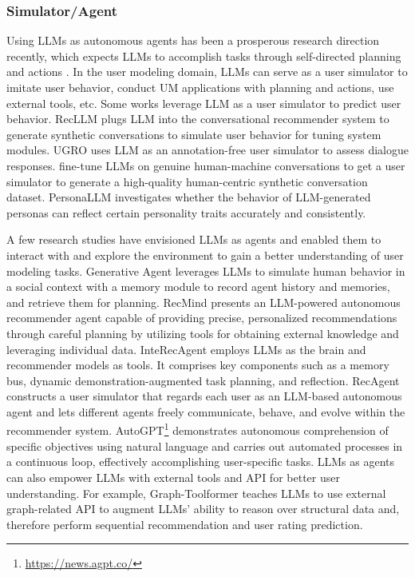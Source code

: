 \documentclass[11pt]{article}
\begin{document}
\subsubsection{Simulator/Agent}
Using LLMs as autonomous agents has been a prosperous research direction recently, which expects LLMs to accomplish tasks through self-directed planning and actions \cite{wang2023survey}. In the user modeling domain, LLMs can serve as a user simulator to imitate user behavior, conduct UM applications with planning and actions, use external tools, etc. Some works leverage LLM as a user simulator to predict user behavior. RecLLM \cite{friedman2023leveraging} plugs LLM into the conversational recommender system to generate synthetic conversations to simulate user behavior for tuning system modules. UGRO \cite{hu2023unlocking} uses LLM as an annotation-free user simulator to assess dialogue responses.
\citet{kong2023large} fine-tune LLMs on genuine human-machine conversations to get a user simulator to generate a high-quality human-centric synthetic conversation dataset. PersonaLLM \cite{jiang2023personallm} investigates whether the behavior of LLM-generated personas can reflect certain personality traits accurately and consistently. 


A few research studies have envisioned LLMs as agents and enabled them to interact with and explore the environment to gain a better understanding of user modeling tasks.
Generative Agent \cite{park2023generative} leverages LLMs to simulate human behavior in a social context with a memory module to record agent history and memories, and retrieve them for planning.
RecMind \cite{wang2023recmind} presents an LLM-powered autonomous recommender agent capable of providing precise, personalized recommendations through careful planning by utilizing tools for obtaining external knowledge and leveraging individual data. InteRecAgent \cite{huang2023recommender} employs LLMs as the brain and recommender models as tools. It comprises key components such as a memory bus, dynamic demonstration-augmented task planning, and reflection. RecAgent \cite{wang2023recagent} constructs a user simulator that regards each user as an LLM-based autonomous agent and lets different agents freely communicate, behave, and evolve within the recommender system. AutoGPT\footnote{\url{https://news.agpt.co/}} demonstrates autonomous comprehension of specific objectives using natural language and carries out automated processes in a continuous loop, effectively accomplishing user-specific tasks. LLMs as agents can also empower LLMs with external tools and API for better user understanding. For example, Graph-Toolformer \cite{zhang2023graph} teaches LLMs to use external graph-related API to augment LLMs' ability to reason over structural data and, therefore perform sequential recommendation and user rating prediction.
\end{document}
